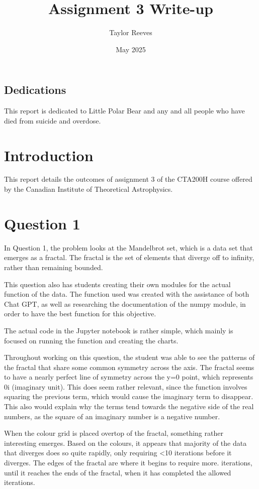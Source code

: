 \documentclass{article}
\title{Assignment 3 Write-up}
\author{Taylor Reeves}
\date{May 2025}
\begin{document}
\maketitle

\subsection{Dedications}
This report is dedicated to Little Polar Bear and any and all people who have died from suicide and overdose.

\section{Introduction}
This report details the outcomes of assignment 3 of the CTA200H course offered by the Canadian Institute of Theoretical Astrophysics. 


\section{Question 1}

In Question 1, the problem looks at the Mandelbrot set, which is a data set that emerges as a fractal. The fractal is the set of elements that diverge off to infinity, rather than remaining bounded.

This question also has students creating their own modules for the actual function of the data. The function used was created with the assistance of both Chat GPT, as well as researching the documentation of the numpy module, in order to have the best function for this objective. 

The actual code in the Jupyter notebook is rather simple, which mainly is focused on running the function and creating the charts.

Throughout working on this question, the student was able to see the patterns of the fractal that share some common symmetry across the axis. The fractal seems to have a nearly perfect line of symmetry across the y=0 point, which represents 0i (imaginary unit). This does seem rather relevant, since the function involves squaring the previous term, which would cause the imaginary term to disappear. This also would explain why the terms tend towards the negative side of the real numbers, as the square of an imaginary number is a negative number.

When the colour grid is placed overtop of the fractal, something rather interesting emerges. Based on the colours, it appears that majority of the data that diverges does so quite rapidly, only requiring <10 iterations before it diverges. The edges of the fractal are where it begins to require more. iterations, until it reaches the ends of the fractal, when it has completed the allowed iterations.
\end{document}
